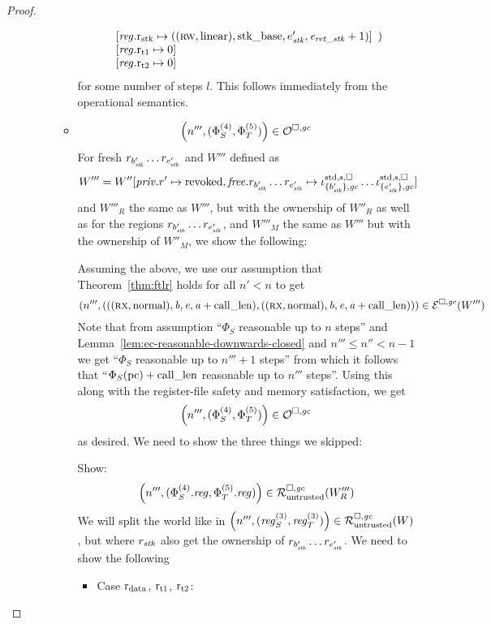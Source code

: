 \begin{proof}
\begin{description}
\begin{itemize}
\begin{itemize}
\[\begin{array}[t]{l}
            \updReg{\rstk}{((\rw,\linear),\stkb,e_\stk',\eaddr_\var{ret\_stk}+1)} \\
            \updReg{\rtmp{1}}{0} \\
            \updReg{\rtmp{2}}{0}
          \end{array})
        \]
        for some number of steps $l$. This follows immediately from the
        operational semantics.
      \item
        \[
          \npair[n''']{(\Phi^{(4)}_S,\Phi^{(5)}_T)} \in \lro
        \]
        For fresh $r_{b_\stk'}\dots r_{e_\stk'}$ and $W'''$ defined as
        \[
          W''' = W''[\priv.r' \mapsto \revoked,\free.r_{b_\stk'}\dots r_{e_\stk'}\mapsto \stdreg{\{b_\stk'\},\gc}{\spa} \dots \stdreg{\{e_\stk'\},\gc}{\spa}]
        \]
        and $W'''_R$ the same as $W'''$, but with the ownership of $W''_R$ as well as for the regions $r_{b_\stk'}\dots r_{e_\stk'}$,
        and $W'''_M$ the same as $W'''$ but with the ownership of $W''_M$,
        we show the following:

        Assuming the above, we use our assumption that Theorem~\ref{thm:ftlr} holds for all $n' < n$ to get
        \[
          \npair[n''']{(((\rx,\normal),\baddr,\eaddr,\aaddr+\calllen),((\rx,\normal),\baddr,\eaddr,\aaddr+\calllen))} \in \lre(W''')
        \]
        Note that from assumption ``$\Phi_S$ reasonable up to $n$ steps'' and Lemma~\ref{lem:ec-reasonable-downwards-closed} and $n''' \le n'' < n - 1$ we get ``$\Phi_S$ reasonable up to $n'''+1$ steps'' from which it follows that ``$\Phi_S(\pcreg) + \calllen$ reasonable up to $n'''$ steps''.
        Using this along with the register-file safety and memory satisfaction,
        we get
        \[
          \npair[n''']{(\Phi^{(4)}_S,\Phi^{(5)}_T)} \in \lro
        \]
        as desired. We need to show the three things we skipped:

        Show:
        \[
          \npair[n''']{(\Phi_S^{(4)}.\reg,\Phi_T^{(5)}.\reg)} \in \lrr(W'''_R)
        \]
        We will split the world like in $\npair[n''']{(\reg_S^{(3)},\reg_T^{(3)})} \in \lrr(W)$, but where $r_\stk$ also get the ownership of $r_{b_\stk'}\dots r_{e_\stk'}$.
        We need to show the following
        \begin{itemize}
        \item Case $\rdata$, $\rtmp{1}$, $\rtmp{2}$:


\end{itemize}
\end{itemize}
\end{itemize}
\end{description}
\end{proof}
